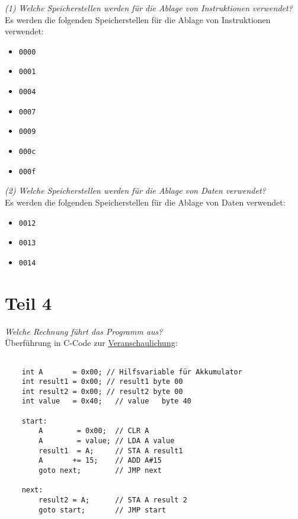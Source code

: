 \textit{(1) Welche Speicherstellen werden für die Ablage von Instruktionen
verwendet?}\\

\noindent
Es werden die folgenden Speicherstellen für die Ablage von Instruktionen verwendet:

\begin{itemize}
    \itemsep0.5em
    \item \texttt{0000}
    \item \texttt{0001}
    \item \texttt{0004}
    \item \texttt{0007}
    \item \texttt{0009}
    \item \texttt{000c}
    \item \texttt{000f}
\end{itemize}

\vspace{5mm}

\noindent
\textit{(2) Welche Speicherstellen werden für die Ablage von Daten verwendet?}\\

\noindent
Es werden die folgenden Speicherstellen für die Ablage von Daten verwendet:

\begin{itemize}
    \itemsep0.5em
    \item \texttt{0012}
    \item \texttt{0013}
    \item \texttt{0014}
\end{itemize}

\section{Teil 4}

\noindent
\textit{Welche Rechnung führt das Programm aus?}\\

\noindent
Überführung in C-Code zur \underline{Veranschaulichung}:

\begin{verbatim}

    int A       = 0x00; // Hilfsvariable für Akkumulator
    int result1 = 0x00; // result1 byte 00
    int result2 = 0x00; // result2 byte 00
    int value   = 0x40;   // value   byte 40

    start:
        A        = 0x00;  // CLR A
        A        = value; // LDA A value
        result1  = A;     // STA A result1
        A       += 15;    // ADD A#15
        goto next;        // JMP next

    next:
        result2 = A;      // STA A result 2
        goto start;       // JMP start
\end{verbatim}\\

